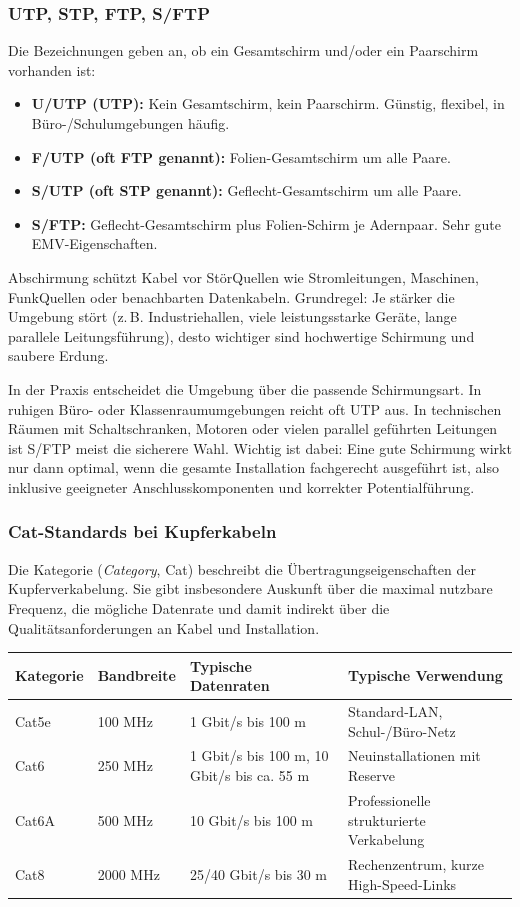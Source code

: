 \documentclass[11pt, oneside, numbers=nönddot]{scrbook}
\begin{document}
\subsubsection{UTP, STP, FTP, S/FTP}
Die Bezeichnungen geben an, ob ein Gesamtschirm und/oder ein Paarschirm vorhanden ist:
\begin{itemize}
\item \textbf{U/UTP (UTP):} Kein Gesamtschirm, kein Paarschirm. Günstig, flexibel, in Büro-/Schulumgebungen häufig.
\item \textbf{F/UTP (oft FTP genannt):} Folien-Gesamtschirm um alle Paare.
\item \textbf{S/UTP (oft STP genannt):} Geflecht-Gesamtschirm um alle Paare.
\item \textbf{S/FTP:} Geflecht-Gesamtschirm plus Folien-Schirm je Adernpaar. Sehr gute EMV-Eigenschaften.
\end{itemize}

Abschirmung schützt Kabel vor StörQuellen wie Stromleitungen, Maschinen, FunkQuellen oder benachbarten Datenkabeln. Grundregel: Je stärker die Umgebung stört (z.\,B. Industriehallen, viele leistungsstarke Geräte, lange parallele Leitungsführung), desto wichtiger sind hochwertige Schirmung und saubere Erdung.

In der Praxis entscheidet die Umgebung über die passende Schirmungsart. In ruhigen Büro- oder Klassenraumumgebungen reicht oft UTP aus. In technischen Räumen mit Schaltschranken, Motoren oder vielen parallel geführten Leitungen ist S/FTP meist die sicherere Wahl. Wichtig ist dabei: Eine gute Schirmung wirkt nur dann optimal, wenn die gesamte Installation fachgerecht ausgeführt ist, also inklusive geeigneter Anschlusskomponenten und korrekter Potentialführung.

\subsubsection{Cat-Standards bei Kupferkabeln}
Die Kategorie (\textit{Category}, Cat) beschreibt die Übertragungseigenschaften der Kupferverkabelung. Sie gibt insbesondere Auskunft über die maximal nutzbare Frequenz, die mögliche Datenrate und damit indirekt über die Qualitätsanforderungen an Kabel und Installation.

\begin{longtable}{|p{1.7cm}|p{2.0cm}|p{4.4cm}|p{5.2cm}|}
\hline
\textbf{Kategorie} & \textbf{Bandbreite} & \textbf{Typische Datenraten} & \textbf{Typische Verwendung} \\
\hline
Cat5e & 100 MHz & 1 Gbit/s bis 100 m & Standard-LAN, Schul-/Büro-Netz \\
\hline
Cat6 & 250 MHz & 1 Gbit/s bis 100 m, 10 Gbit/s bis ca. 55 m & Neuinstallationen mit Reserve \\
\hline
Cat6A & 500 MHz & 10 Gbit/s bis 100 m & Professionelle strukturierte Verkabelung \\
\hline
Cat8 & 2000 MHz & 25/40 Gbit/s bis 30 m & Rechenzentrum, kurze High-Speed-Links \\
\hline
\end{longtable}
\end{document}
